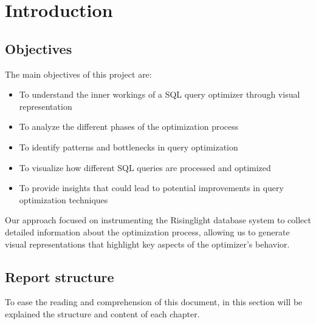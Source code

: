 \documentclass[a4paper,12pt]{scrreprt}
\begin{document}
\clearpage
{}

\clearpage
\pagestyle{plain}
\hypertarget{toc}{}
\tableofcontents

\clearpage
\pagestyle{plain}
\listoffigures

\clearpage
\pagestyle{fancy}


\chapter{Introduction}\label{chap:intro}
\thispagestyle{fancy}
\section{Objectives}
The main objectives of this project are:
\begin{itemize}
    \item To understand the inner workings of a SQL query optimizer through visual representation
    \item To analyze the different phases of the optimization process
    \item To identify patterns and bottlenecks in query optimization
    \item To visualize how different SQL queries are processed and optimized
    \item To provide insights that could lead to potential improvements in query optimization techniques
\end{itemize}

Our approach focused on instrumenting the Risinglight database system to collect detailed information about the optimization process, allowing us to generate visual representations that highlight key aspects of the optimizer's behavior.

\newpage
\section{Report structure}
To ease the reading and comprehension of this document, in this section will be explained the structure and content of each chapter.
\end{document}
